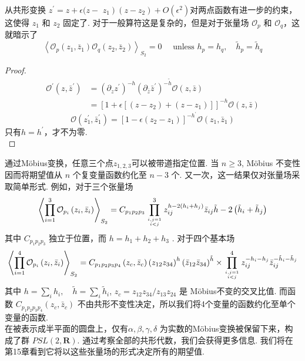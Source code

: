 从共形变换 $z^{\prime}=z+\epsilon(z-$ $\left.z_{1}\right)\left(z-z_{2}\right)+O\left(\epsilon^{2}\right)$对两点函数有进一步的约束，这使得 $z_{1}$ 和 $z_{2}$ 固定了. 对于一般算符这是复杂的，但是对于张量场 $\mathcal{O}_{p}$ 和 $\mathcal{O}_{q}$，这就暗示了
\begin{equation}
	\left\langle\mathcal{O}_{p}\left(z_{1}, \bar{z}_{1}\right) \mathcal{O}_{q}\left(z_{2}, \bar{z}_{2}\right)\right\rangle_{S_{2}}=0 \quad \text { unless } h_{p}=h_{q}, \quad \tilde{h}_{p}=\tilde{h}_{q}
\end{equation}
\begin{proof}
$$
\begin{aligned}
\mathcal{O}^{\prime}\left(z, \bar{z}^{\prime}\right) &=\left(\partial_{z} z^{\prime}\right)^{-h}\left( \partial_{\bar{z}} \bar{z}^{\prime}\right)^{-\tilde{h}} \mathcal{O}(z, \bar{z}) \\
&=\left[1+\epsilon[(z-z_{2})+(z-z_{1})]\right]^{-h} \mathcal{O}(z, \bar{z})
\end{aligned}
$$
$$
\mathcal{O}\left(z_1^{\prime}, \bar{z}_1^\prime\right)=\left[1-\epsilon\left(z_{2}-z_{1}\right)\right]^{-h^\prime}\mathcal{O}\left(z_1, \bar{z}_1\right)
$$
只有$h=h^\prime$，才不为零.\\
\end{proof}

通过Möbius变换，任意三个点$z_{1,2,3}$可以被带道指定位置. 当 $n \geq 3$, Möbius 不变性因而将期望值从 $n$ 个复变量函数约化至 $n-3$ 个. 又一次，这一结果仅对张量场采取简单形式. 例如，对于三个张量场
\begin{equation}
	\left\langle\prod_{i=1}^{3} \mathcal{O}_{p_{i}}\left(z_{i}, \bar{z}_{i}\right)\right\rangle_{S_{2}}=C_{p_{1} p_{2} p_{3}} \prod_{i, j=1 \atop i<j}^{3} z_{i j}^{h-2\left(h_{i}+h_{j}\right)} \bar{z}_{i j} \tilde{h}-2\left(\tilde{h}_{i}+\tilde{h}_{j}\right)
\end{equation}
其中 $C_{p_{1} p_{2} p_{3}}$ 独立于位置，而 $h=h_{1}+h_{2}+h_{3} $ . 对于四个基本场
\begin{equation}
	\left\langle\prod_{i=1}^{4} \mathcal{O}_{p_{i}}\left(z_{i}, \bar{z}_{i}\right)\right\rangle_{S_{2}}=C_{p_{1} p_{2} p_{3} p_{4}}\left(z_{c}, \bar{z}_{c}\right)\left(z_{12} z_{34}\right)^{h}\left(\bar{z}_{12} \bar{z}_{34}\right)^{\tilde{h}} \times \prod_{i, j=1 \atop i<j}^{4} z_{i j}^{-h_{i}-h_{j}} \bar{z}_{i j}^{-\tilde{h}_{i}-\tilde{h}_{j}}
\end{equation}
其中 $h=\sum_{i} h_{i}, \quad \tilde{h}=\sum_{i} \tilde{h}_{i}$, \quad $z_{c}=z_{12} z_{34} / z_{13} z_{24}$ 是 Möbius不变的交叉比值. 而函数 $C_{p_{1} p_{2} p_{3} p_{4}}\left(z_{c}, \bar{z}_{c}\right)$ 不由共形不变性决定，所以我们将4个变量的函数约化至单个变量的函数.\\
在被表示成半平面的圆盘上，仅有$\alpha, \beta, \gamma, \delta$ 为实数的Möbius变换被保留下来，构成了群 $P S L(2, \mathbf{R})$. 通过考察全部的共形代数，我们会获得更多信息. 我们将在第15章看到它将以这些张量场的形式决定所有的期望值.\\


